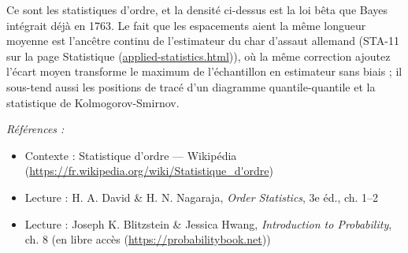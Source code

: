 \documentclass[11pt]{article}
\newenvironment{refs}{\par\small\noindent\emph{Références :}\begin{itemize}\setlength\itemsep{0pt}}{\end{itemize}\normalsize}
\begin{document}
\noindent Ce sont les statistiques d'ordre, et la densité ci-dessus est la loi bêta que
Bayes intégrait déjà en 1763. Le fait que les espacements aient la même longueur moyenne est
l'ancêtre continu de l'estimateur du char d'assaut allemand (STA-11 sur la page
Statistique (\url{applied-statistics.html})), où la même correction \og{} ajoutez l'écart moyen \fg{}
transforme le maximum de l'échantillon en estimateur sans biais ; il sous-tend aussi les positions
de tracé d'un diagramme quantile-quantile et la statistique de Kolmogorov-Smirnov.

\begin{refs}
\item Contexte : Statistique d'ordre --- Wikipédia (\url{https://fr.wikipedia.org/wiki/Statistique_d'ordre})
\item Lecture : H. A. David \& H. N. Nagaraja, \textit{Order Statistics}, 3e éd., ch. 1--2
\item Lecture : Joseph K. Blitzstein \& Jessica Hwang, \textit{Introduction to Probability}, ch. 8 (en libre accès (\url{https://probabilitybook.net}))
\end{refs}

\bigskip
\end{document}
